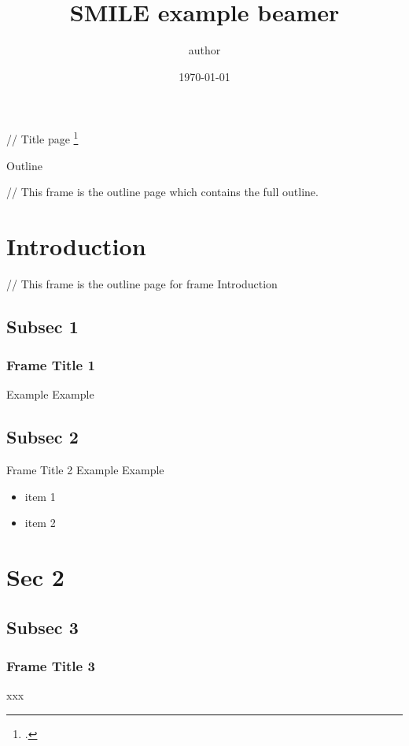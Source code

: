 \documentclass[aspectratio=1610]{beamer}
\title{SMILE example beamer\footfullcite{nasy_beamer_2022}}
\author{author}
\date\today
\begin{document}
\begin{frame}[plain]
  \titlepage
  // Title page \footcite{nasy_beamer_2022}
\end{frame}


\begin{frame}{Outline}
  \tableofcontents

  // This frame is the outline page which contains the full outline.
  \end{frame}

\section{Introduction}

\begin{frame}
  \tableofcontents[currentsection, subsectionstyle=show/show/hide]

  // This frame is the outline page for frame Introduction
\end{frame}


\subsection {Subsec 1}
\begin{frame}
  \frametitle{Frame Title 1}
  Example Example
\end{frame}


\subsection {Subsec 2}
\begin{frame}{Frame Title 2}
  Example Example

\begin{itemize}
    \item item 1
    \item item 2
\end{itemize}

\end{frame}


\section {Sec 2}

\begin{frame}
  \tableofcontents[currentsection, subsectionstyle=show/show/hide]
\end{frame}

\subsection {Subsec 3}
\begin{frame}
  \frametitle{Frame Title 3}
xxx
\end{frame}
\end{document}
